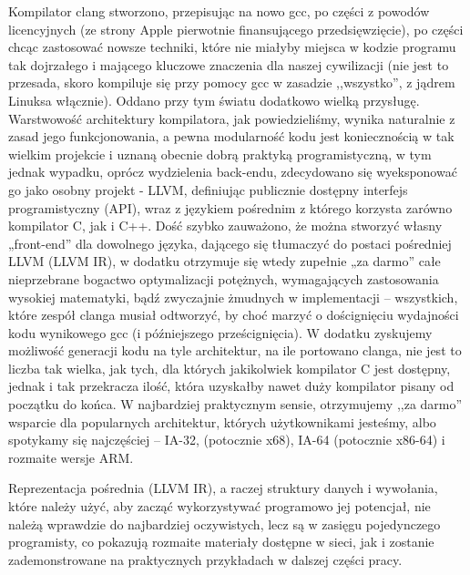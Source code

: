 Kompilator clang stworzono, przepisując na nowo gcc, po części z powodów licencyjnych (ze strony Apple pierwotnie finansującego przedsięwzięcie), po części chcąc zastosować nowsze techniki, które nie miałyby miejsca w kodzie programu tak dojrzałego i mającego kluczowe znaczenia dla naszej cywilizacji (nie jest to przesada, skoro kompiluje się przy pomocy gcc w zasadzie ,,wszystko'', z jądrem Linuksa włącznie). Oddano przy tym światu dodatkowo wielką przysługę. Warstwowość architektury kompilatora, jak powiedzieliśmy, wynika naturalnie z zasad jego funkcjonowania, a pewna modularność kodu jest koniecznością w tak wielkim projekcie i uznaną obecnie dobrą praktyką programistyczną, w tym jednak wypadku, oprócz wydzielenia back-endu, zdecydowano się wyeksponować go jako osobny projekt - LLVM, definiując publicznie dostępny interfejs programistyczny (API), wraz z językiem pośrednim z którego korzysta zarówno kompilator C, jak i C++. Dość szybko zauważono, że można stworzyć własny „front-end” dla dowolnego języka, dającego się tłumaczyć do postaci pośredniej LLVM (LLVM IR), w dodatku otrzymuje się wtedy zupełnie „za darmo” całe nieprzebrane bogactwo optymalizacji potężnych, wymagających zastosowania wysokiej matematyki, bądź zwyczajnie żmudnych w implementacji – wszystkich, które zespół clanga musiał odtworzyć, by choć marzyć o doścignięciu wydajności kodu wynikowego gcc (i późniejszego prześcignięcia). W dodatku zyskujemy możliwość generacji kodu na tyle architektur, na ile portowano clanga, nie jest to liczba tak wielka, jak tych, dla których jakikolwiek kompilator C jest dostępny, jednak i tak przekracza ilość, która uzyskałby nawet duży kompilator pisany od początku do końca. W najbardziej praktycznym sensie, otrzymujemy ,,za darmo'' wsparcie dla popularnych architektur, których użytkownikami jesteśmy, albo spotykamy się najczęściej – IA-32, (potocznie x68), IA-64 (potocznie x86-64) i rozmaite wersje ARM.\cite{llvm_org}\cite{forum_llvm_apple_licenses}

Reprezentacja pośrednia (LLVM IR), a raczej struktury danych i wywołania, które należy użyć, aby zacząć wykorzystywać programowo jej potencjał, nie należą wprawdzie do najbardziej oczywistych, lecz są w zasięgu pojedynczego programisty, co pokazują rozmaite materiały dostępne w sieci\cite{kalleidoscope}, jak i zostanie zademonstrowane na praktycznych przykładach w dalszej części pracy.

